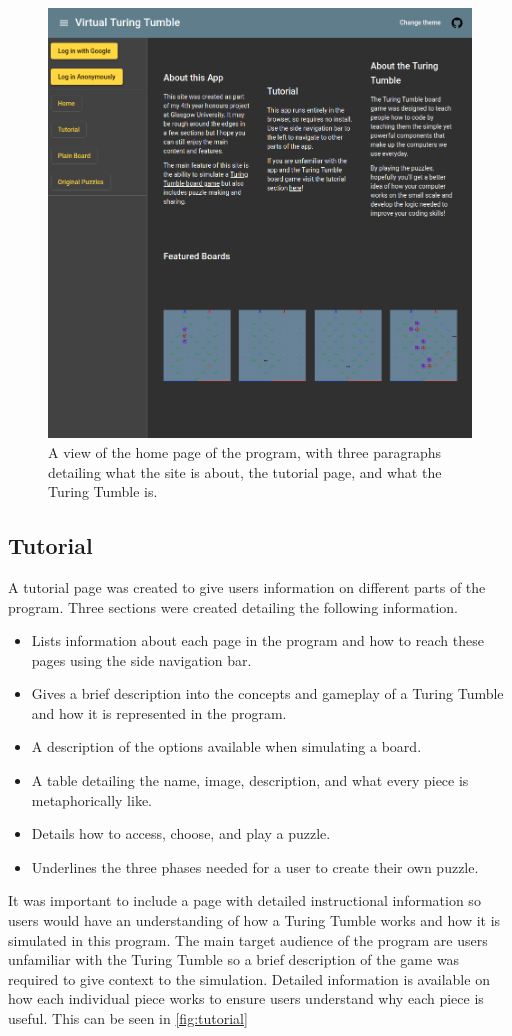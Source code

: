 \documentclass{l4proj}
\begin{document}
\begin{figure}
    \centering
    \includegraphics[width=0.65\linewidth]{images/darkTheme.png}
    \caption{A view of the home page of the program, with three paragraphs detailing what the site is about, the tutorial page, and what the Turing Tumble is.}
    \label{fig:homePage}
\end{figure}

\subsection{Tutorial}
A tutorial page was created to give users information on different parts of the program. Three sections were created detailing the following information.
\begin{itemize}
    \item Lists information about each page in the program and how to reach these pages using the side navigation bar.
    \item Gives a brief description into the concepts and gameplay of a Turing Tumble and how it is represented in the program.
    \item A description of the options available when simulating a board.
    \item A table detailing the name, image, description, and what every piece is metaphorically like.
    \item Details how to access, choose, and play a puzzle.
    \item Underlines the three phases needed for a user to create their own puzzle.
\end{itemize}

It was important to include a page with detailed instructional information so users would have an understanding of how a Turing Tumble works and how it is simulated in this program. The main target audience of the program are users unfamiliar with the Turing Tumble so a brief description of the game was required to give context to the simulation. Detailed information is available on how each individual piece works to ensure users understand why each piece is useful. This can be seen in \ref{fig:tutorial}
\end{document}
